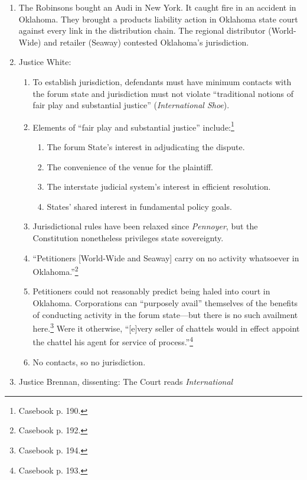 \begin{enumerate}
    \item The Robinsons bought an Audi in New York. It caught fire in an
    accident in Oklahoma. They brought a products liability action in Oklahoma 
    state court against every link in the distribution chain. The regional 
    distributor (World-Wide) and retailer (Seaway) contested Oklahoma's 
    jurisdiction.
    \item Justice White: \begin{enumerate}
        \item To establish jurisdiction, defendants must have minimum contacts 
        with the forum state and jurisdiction must not violate ``traditional 
        notions of fair play and substantial justice'' (\emph{International 
        Shoe}).
        \item Elements of ``fair play and substantial justice'' 
        include:\footnote{Casebook p. 190.}
        \begin{enumerate}
            \item The forum State's interest in adjudicating the dispute.
            \item The convenience of the venue for the plaintiff.
            \item The interstate judicial system's interest in efficient 
            resolution.
            \item States' shared interest in fundamental policy goals.
        \end{enumerate}
        \item Jurisdictional rules have been relaxed since \emph{Pennoyer}, 
        but the Constitution nonetheless privileges state sovereignty.  \item 
        ``Petitioners [World-Wide and Seaway] carry on no activity whatsoever 
        in Oklahoma.''\footnote{Casebook p. 192.}
        \item Petitioners could not reasonably predict being haled into court 
        in Oklahoma. Corporations can ``purposely avail'' themselves of the 
        benefits of conducting activity in the forum state---but there is no 
        such availment here.\footnote{Casebook p. 194.} Were it otherwise, 
        ``[e]very seller of chattels would in effect appoint the chattel his 
        agent for service of process.''\footnote{Casebook p. 193.}
        \item No contacts, so no jurisdiction.
    \end{enumerate}
    \item Justice Brennan, dissenting: The Court reads \emph{International 
}
\end{enumerate}
